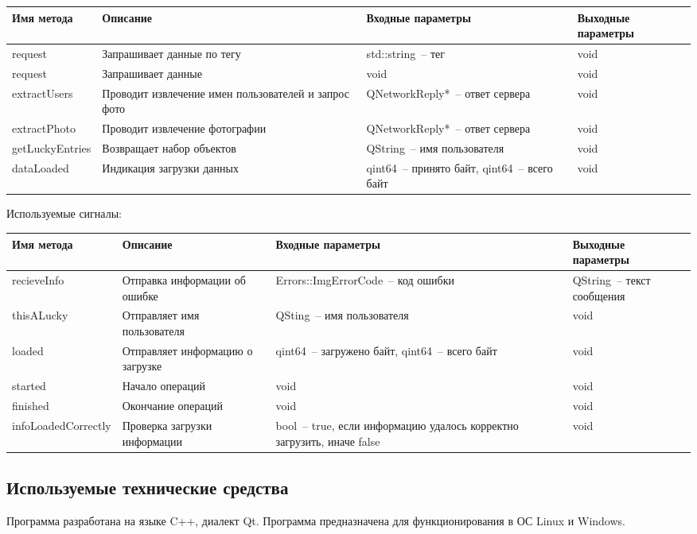 \documentclass[a4paper,14pt,russian]{extreport}
\begin{document}
\begin{longtable}{|m{3 cm}|m{3 cm}|m{4 cm}|m{4 cm}|}
\hline
Имя метода & Описание & Входные параметры & Выходные параметры \\
\hline
request & Запрашивает данные по тегу & std::string~-- тег & void \\
\hline
request & Запрашивает данные & void & void \\
\hline
{extract\-Users} & Проводит извлечение имен пользователей и запрос фото & {QNetwork\-Reply*}~-- ответ сервера & void \\
\hline
{extract\-Photo} & Проводит извлечение фотографии & {QNetwork\-Reply*}~-- ответ сервера & void \\
\hline
{get\-Lucky\-Entries} & Возвращает набор объектов & QString~-- имя пользователя & void \\
\hline
{data\-Loaded} & Индикация загрузки данных & qint64~-- принято байт, qint64~-- всего байт & void \\
\hline
\end{longtable}

Используемые сигналы:

\begin{longtable}{|m{3 cm}|m{3 cm}|m{4 cm}|m{4 cm}|}
\hline
Имя метода & Описание & Входные параметры & Выходные параметры \\
\hline
{recieve\-Info} & Отправка информации об ошибке & {Errors::Img\-Error\-Code}~-- код ошибки & QString~-- текст сообщения \\
\hline
{thisA\-Lucky} & Отправляет имя пользователя & QSting~-- имя пользователя & void \\
\hline
loaded & Отправляет информацию о загрузке & qint64~-- загружено байт, qint64~-- всего байт & void \\
\hline
started & Начало операций & void & void \\
\hline
finished & Окончание операций & void & void \\
\hline
{info\-Loaded\-Correctly} & Проверка загрузки информации & bool~-- true, если информацию удалось корректно загрузить, иначе false & void \\
\hline
\end{longtable}

\subsection{Используемые технические средства}

Программа разработана на языке C++, диалект Qt. Программа предназначена для функционирования в ОС Linux и Windows.
\end{document}

